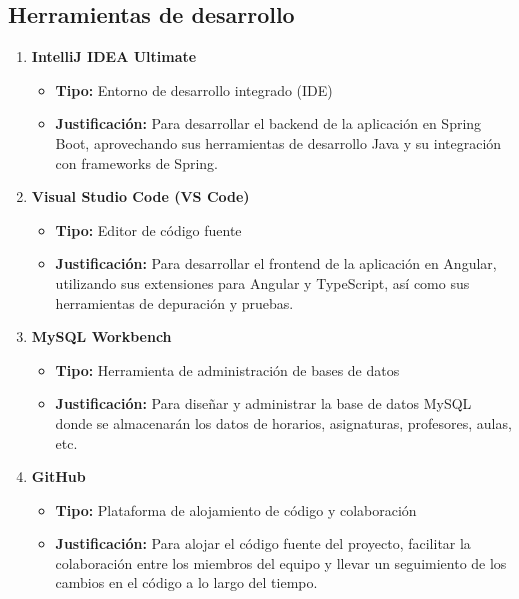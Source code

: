 \documentclass{article} %
\begin{document}
\subsection{Herramientas de desarrollo}
\begin{enumerate}[font=\bfseries]
    \item \textbf{IntelliJ IDEA Ultimate}
    \begin{itemize}
        \item \textbf{Tipo:} Entorno de desarrollo integrado (IDE)
        \item \textbf{Justificación:} Para desarrollar el backend de la aplicación en Spring Boot, aprovechando sus herramientas de desarrollo Java y su integración con frameworks de Spring.
    \end{itemize}
    
    \item \textbf{Visual Studio Code (VS Code)}
    \begin{itemize}
        \item \textbf{Tipo:} Editor de código fuente
        \item \textbf{Justificación:} Para desarrollar el frontend de la aplicación en Angular, utilizando sus extensiones para Angular y TypeScript, así como sus herramientas de depuración y pruebas.
    \end{itemize}
    
    \item \textbf{MySQL Workbench}
    \begin{itemize}
        \item \textbf{Tipo:} Herramienta de administración de bases de datos
        \item \textbf{Justificación:} Para diseñar y administrar la base de datos MySQL donde se almacenarán los datos de horarios, asignaturas, profesores, aulas, etc.
    \end{itemize}
    
    \item \textbf{GitHub}
    \begin{itemize}
        \item \textbf{Tipo:} Plataforma de alojamiento de código y colaboración
        \item \textbf{Justificación:} Para alojar el código fuente del proyecto, facilitar la colaboración entre los miembros del equipo y llevar un seguimiento de los cambios en el código a lo largo del tiempo.
    \end{itemize}
    

\end{enumerate}
\end{document}
